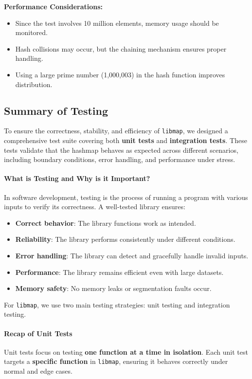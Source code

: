 \documentclass[titlepage]{article}
\begin{document}
\textbf{Performance Considerations:}
\begin{itemize}
    \item Since the test involves 10 million elements, memory usage should be monitored.
    \item Hash collisions may occur, but the chaining mechanism ensures proper handling.
    \item Using a large prime number (1,000,003) in the hash function improves distribution.
\end{itemize}

\subsection{Summary of Testing}

To ensure the correctness, stability, and efficiency of \texttt{libmap}, we designed a comprehensive test suite covering both \textbf{unit tests} and \textbf{integration tests}. These tests validate that the hashmap behaves as expected across different scenarios, including boundary conditions, error handling, and performance under stress.

\paragraph{What is Testing and Why is it Important?}
In software development, testing is the process of running a program with various inputs to verify its correctness. A well-tested library ensures:
\begin{itemize}
    \item \textbf{Correct behavior}: The library functions work as intended.
    \item \textbf{Reliability}: The library performs consistently under different conditions.
    \item \textbf{Error handling}: The library can detect and gracefully handle invalid inputs.
    \item \textbf{Performance}: The library remains efficient even with large datasets.
    \item \textbf{Memory safety}: No memory leaks or segmentation faults occur.
\end{itemize}

For \texttt{libmap}, we use two main testing strategies: unit testing and integration testing.

\paragraph{Recap of Unit Tests}
Unit tests focus on testing \textbf{one function at a time in isolation}. Each unit test targets a \textbf{specific function} in \texttt{libmap}, ensuring it behaves correctly under normal and edge cases.
\end{document}
